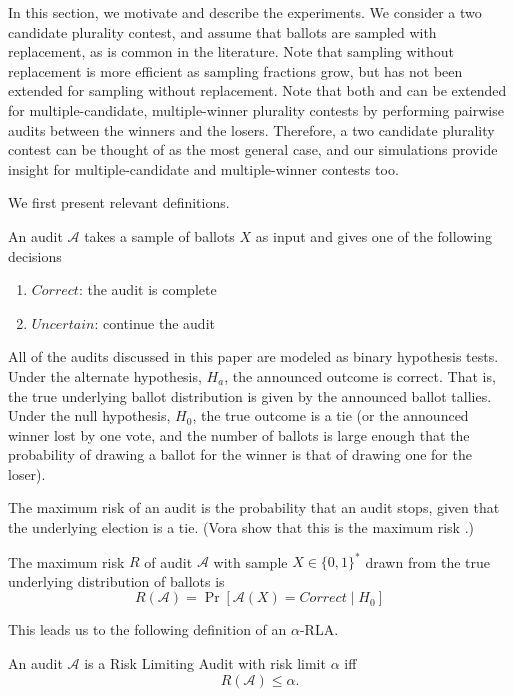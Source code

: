 In this section, we motivate and describe the experiments. We consider a two candidate plurality contest, and assume that ballots are sampled with replacement, as is common in the literature. Note that sampling without replacement is more efficient as sampling fractions grow, but \Minerva has not been extended for sampling without replacement. Note that both \BRAVO and \Minerva can be extended for multiple-candidate, multiple-winner plurality contests by performing pairwise audits between the winners and the losers\cite{RLA, arxiv_athena}. Therefore, a two candidate plurality contest can be thought of as the most general case, and our simulations provide insight for multiple-candidate and multiple-winner contests too.

We first present relevant definitions.

\begin{definition}
An audit $\mathcal{A}$ takes a sample of ballots $X$ as input and gives one of the 
following decisions
\begin{enumerate}
\item
$Correct$: the audit is complete
\item
$Uncertain$: continue the audit
\end{enumerate}
\end{definition}

All of the audits discussed in this paper are modeled as binary hypothesis tests. Under the alternate hypothesis, $H_a$, the announced outcome is correct. That is, the true underlying ballot distribution is given by the announced ballot tallies. Under the null hypothesis, $H_0$, the true outcome is a tie (or the announced winner lost by one vote, and the number of ballots is large enough that the probability of drawing a ballot for the winner is that of drawing one for the loser).

The maximum risk of an audit is the probability that an audit stops, given that the underlying election is a tie. (Vora show that this is the maximum risk \cite{Bayesian-RLA}.) 
\begin{definition}[Risk]
The maximum risk $R$ of audit $\mathcal{A}$ with sample $X\in \{0,1\}^*$ drawn from 
the true underlying distribution of ballots is
$$R(\mathcal{A})=\Pr[\mathcal{A}(X)=Correct \mid H_0]$$
\end{definition}

This leads us to the following definition of an $\alpha$-RLA.
\begin{definition}
An audit $\mathcal{A}$ is a Risk Limiting Audit with 
risk limit $\alpha$ iff 
$$R(\mathcal{A}) \le \alpha.$$
\end{definition}

